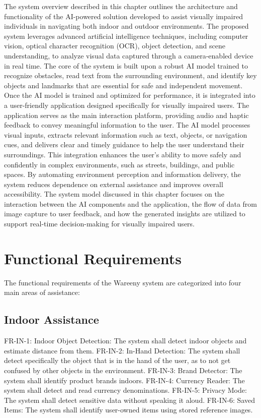 \documentclass[12pt,a4paper]{report}
\begin{document}
The system overview described in this chapter outlines the architecture and functionality of the AI-powered solution developed to assist visually impaired individuals in navigating both indoor and outdoor environments. The proposed system leverages advanced artificial intelligence techniques, including computer vision, optical character recognition (OCR), object detection, and scene understanding, to analyze visual data captured through a camera-enabled device in real time. The core of the system is built upon a robust AI model trained to recognize obstacles, read text from the surrounding environment, and identify key objects and landmarks that are essential for safe and independent movement. Once the AI model is trained and optimized for performance, it is integrated into a user-friendly application designed specifically for visually impaired users. The application serves as the main interaction platform, providing audio and haptic feedback to convey meaningful information to the user. The AI model processes visual inputs, extracts relevant information such as text, objects, or navigation cues, and delivers clear and timely guidance to help the user understand their surroundings. This integration enhances the user's ability to move safely and confidently in complex environments, such as streets, buildings, and public spaces. By automating environment perception and information delivery, the system reduces dependence on external assistance and improves overall accessibility. The system model discussed in this chapter focuses on the interaction between the AI components and the application, the flow of data from image capture to user feedback, and how the generated insights are utilized to support real-time decision-making for visually impaired users.

\section{Functional Requirements}

The functional requirements of the Wareeny system are categorized into four main areas of assistance:

\subsection{Indoor Assistance}

FR-IN-1: Indoor Object Detection: The system shall detect indoor objects and estimate distance from them. FR-IN-2: In-Hand Detection: The system shall detect specifically the object that is in the hand of the user, as to not get confused by other objects in the environment. FR-IN-3: Brand Detector: The system shall identify product brands indoors. FR-IN-4: Currency Reader: The system shall detect and read currency denominations. FR-IN-5: Privacy Mode: The system shall detect sensitive data without speaking it aloud. FR-IN-6: Saved Items: The system shall identify user-owned items using stored reference images.
\end{document}
